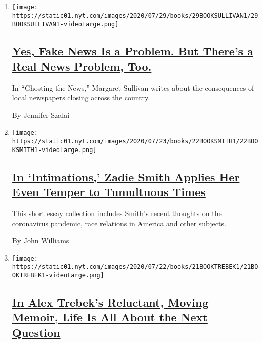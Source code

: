 \begin{enumerate}
\def\labelenumi{\arabic{enumi}.}
\item
  \texttt{[image: https://static01.nyt.com/images/2020/07/29/books/29BOOKSULLIVAN1/29BOOKSULLIVAN1-videoLarge.png]}

  \hypertarget{yes-fake-news-is-a-problem-but-theres-a-real-news-problem-too}{%
  \subsection{\texorpdfstring{\href{/2020/07/26/books/review-ghosting-news-local-journalism-democracy-crisis-margaret-sullivan.html}{Yes,
  Fake News Is a Problem. But There's a Real News Problem,
  Too.}}{Yes, Fake News Is a Problem. But There's a Real News Problem, Too.}}\label{yes-fake-news-is-a-problem-but-theres-a-real-news-problem-too}}

  In ``Ghosting the News,'' Margaret Sullivan writes about the
  consequences of local newspapers closing across the country.

  By Jennifer Szalai
\item
  \texttt{[image: https://static01.nyt.com/images/2020/07/23/books/22BOOKSMITH1/22BOOKSMITH1-videoLarge.png]}

  \hypertarget{in-intimations-zadie-smith-applies-her-even-temper-to-tumultuous-times}{%
  \subsection{\texorpdfstring{\href{/2020/07/22/books/review-intimations-essays-zadie-smith.html}{In
  `Intimations,' Zadie Smith Applies Her Even Temper to Tumultuous
  Times}}{In `Intimations,' Zadie Smith Applies Her Even Temper to Tumultuous Times}}\label{in-intimations-zadie-smith-applies-her-even-temper-to-tumultuous-times}}

  This short essay collection includes Smith's recent thoughts on the
  coronavirus pandemic, race relations in America and other subjects.

  By John Williams
\item
  \texttt{[image: https://static01.nyt.com/images/2020/07/22/books/21BOOKTREBEK1/21BOOKTREBEK1-videoLarge.png]}

  \hypertarget{in-alex-trebeks-reluctant-moving-memoir-life-is-all-about-the-next-question}{%
  \subsection{\texorpdfstring{\href{/2020/07/21/books/review-answer-is-alex-trebek-jeopardy-memoir.html}{In
  Alex Trebek's Reluctant, Moving Memoir, Life Is All About the Next
  Question}}{In Alex Trebek's Reluctant, Moving Memoir, Life Is All About the Next Question}}\label{in-alex-trebeks-reluctant-moving-memoir-life-is-all-about-the-next-question}}


\end{enumerate}
